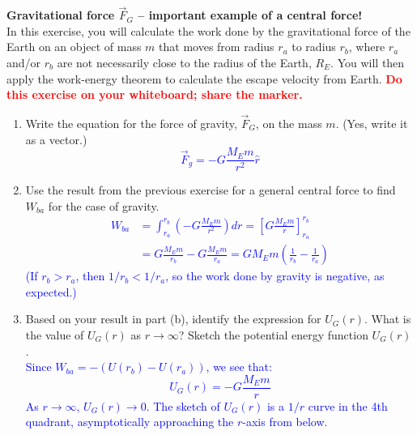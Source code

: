 \documentclass[11pt, letterpaper, openany]{book}
\newenvironment{exercise}[1][Exercise]{%
  \tcolorbox[blanker, breakable, left=1em,
    before skip=1em, after skip=1em,
    borderline west={3pt}{0pt}{PhysNavy},
    colback=PhysCream,
    before upper={\textcolor{PhysNavy}{\sffamily\bfseries #1:}\space}
  ]%
}{%
  \endtcolorbox%
}
\begin{document}
\begin{exercise}[Exercise 6]
\textbf{Gravitational force $\vec{F}_G$ -- important example of a central force!} \\
In this exercise, you will calculate the work done by the gravitational force of the Earth on an object of mass $m$ that moves from radius $r_a$ to radius $r_b$, where $r_a$ and/or $r_b$ are not necessarily close to the radius of the Earth, $R_E$. You will then apply the work-energy theorem to calculate the escape velocity from Earth. \textbf{\textcolor{red}{Do this exercise on your whiteboard; share the marker.}}
\begin{enumerate}[label=(\alph*)]
    \item Write the equation for the force of gravity, $\vec{F}_G$, on the mass $m$. (Yes, write it as a vector.) \\
    \textcolor{blue}{\[ \vec{F}_g = -G\frac{M_E m}{r^2}\hat{r} \]}
    
    \item Use the result from the previous exercise for a general central force to find $W_{ba}$ for the case of gravity. \\
    \textcolor{blue}{
    \begin{align*}
        W_{ba} &= \int_{r_a}^{r_b} \left( -G\frac{M_E m}{r^2} \right) dr = \left[ G\frac{M_E m}{r} \right]_{r_a}^{r_b} \\
        &= G\frac{M_E m}{r_b} - G\frac{M_E m}{r_a} = GM_E m\left( \frac{1}{r_b} - \frac{1}{r_a} \right)
    \end{align*}
    (If $r_b > r_a$, then $1/r_b < 1/r_a$, so the work done by gravity is negative, as expected.)
    }
    
    \item Based on your result in part (b), identify the expression for $U_G(r)$. What is the value of $U_G(r)$ as $r \to \infty$? Sketch the potential energy function $U_G(r)$. \\
    \textcolor{blue}{
    Since $W_{ba} = -(U(r_b) - U(r_a))$, we see that:
    \[ U_G(r) = -G\frac{M_E m}{r} \]
    As $r \to \infty$, $U_G(r) \to 0$. The sketch of $U_G(r)$ is a $1/r$ curve in the 4th quadrant, asymptotically approaching the $r$-axis from below.
    }
    

\end{enumerate}
\end{exercise}
\end{document}

